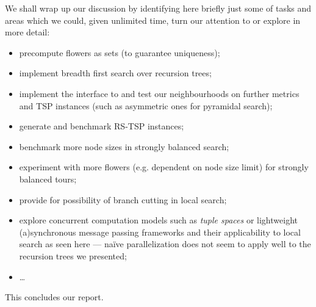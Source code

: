 \documentclass[index=totoc,bibliography=totoc]{scrartcl}
\numberwithin{equation}{section}
\numberwithin{figure}{section}
\numberwithin{table}{section}
\let\defstyle\itshape
\begin{document}
We shall wrap up our discussion by identifying here briefly just some of tasks
and areas which we could, given unlimited time, turn our attention to or
explore in more detail:
\begin{itemize}
  \item
    precompute flowers as sets (to guarantee uniqueness);
  \item
    implement breadth first search over recursion trees;
  \item
    implement the interface to and test our neighbourhoods on further metrics
    and TSP instances (such as asymmetric ones for pyramidal search);
  \item
    generate and benchmark RS-TSP instances;
  \item
    benchmark more node sizes in strongly balanced search;
  \item
    experiment with more flowers (e.g. dependent on node size limit) for strongly balanced tours;
  \item
    provide for possibility of branch cutting in local search;
  \item
    explore concurrent computation models
    such as {\defstyle tuple spaces} or
    lightweight (a)synchronous message passing frameworks
    and their applicability to local search as seen here ---
    naïve parallelization does not seem to apply well to the
    recursion trees we presented;
  \item
    \ldots
\end{itemize}
This concludes our report.

\begin{center}
\vspace{2em}
\vspace{2em}
\end{center}
\clearpage


\end{document}
